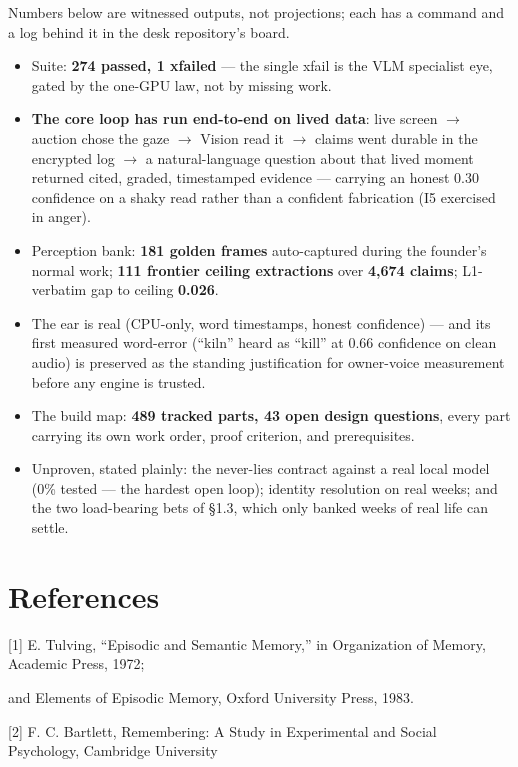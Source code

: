 Numbers below are witnessed outputs, not projections; each has a command and a
log behind it in the desk repository's board.

\begin{itemize}
\tightlist
\item
  Suite: \textbf{274 passed, 1 xfailed} --- the single xfail is the VLM specialist
  eye, gated by the one-GPU law, not by missing work.
\item
  \textbf{The core loop has run end-to-end on lived data}: live screen \(\rightarrow\) auction
  chose the gaze \(\rightarrow\) Vision read it \(\rightarrow\) claims went durable in the encrypted log \(\rightarrow\)
  a natural-language question about that lived moment returned cited, graded,
  timestamped evidence --- carrying an honest 0.30 confidence on a shaky read
  rather than a confident fabrication (I5 exercised in anger).
\item
  Perception bank: \textbf{181 golden frames} auto-captured during the founder's
  normal work; \textbf{111 frontier ceiling extractions} over \textbf{4,674 claims};
  L1-verbatim gap to ceiling \textbf{0.026}.
\item
  The ear is real (CPU-only, word timestamps, honest confidence) --- and its
  first measured word-error (``kiln'' heard as ``kill'' at 0.66 confidence on
  clean audio) is preserved as the standing justification for owner-voice
  measurement before any engine is trusted.
\item
  The build map: \textbf{489 tracked parts, 43 open design questions}, every part
  carrying its own work order, proof criterion, and prerequisites.
\item
  Unproven, stated plainly: the never-lies contract against a real local
  model (0\% tested --- the hardest open loop); identity resolution on real
  weeks; and the two load-bearing bets of \S{}1.3, which only banked weeks of
  real life can settle.
\end{itemize}

\chapter*{References}\label{references}

{[}1{]} E. Tulving, ``Episodic and Semantic Memory,'' in Organization of Memory, Academic Press, 1972;

and Elements of Episodic Memory, Oxford University Press, 1983.

{[}2{]} F. C. Bartlett, Remembering: A Study in Experimental and Social Psychology, Cambridge University

